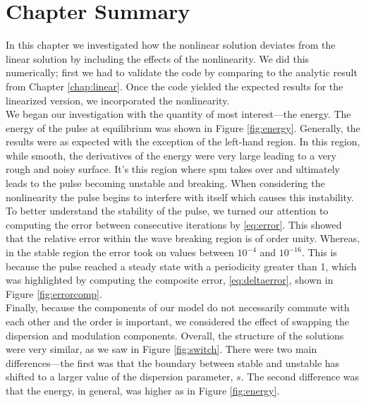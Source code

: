 \section{Chapter Summary}
In this chapter we investigated how the nonlinear solution deviates from the linear solution by including the effects of the nonlinearity. We did this numerically; first we had to validate the code by comparing to the analytic result from Chapter \ref{chap:linear}. Once the code yielded the expected results for the linearized version, we incorporated the nonlinearity. \\

We began our investigation with the quantity of most interest---the energy. The energy of the pulse at equilibrium was shown in Figure \ref{fig:energy}. Generally, the results were as expected with the exception of the left-hand region. In this region, while smooth, the derivatives of the energy were very large leading to a very rough and noisy surface. It's this region where \gls{spm} takes over and ultimately leads to the pulse becoming unstable and breaking. When considering the nonlinearity the pulse begins to interfere with itself which causes this instability. \\

To better understand the stability of the pulse, we turned our attention to computing the error between consecutive iterations by \eqref{eq:error}. This showed that the relative error within the wave breaking region is of order unity. Whereas, in the stable region the error took on values between $10^{-4}$ and $10^{-16}$. This is because the pulse reached a steady state with a periodicity greater than 1, which was highlighted by computing the composite error, \eqref{eq:deltaerror}, shown in Figure \ref{fig:errorcomp}. \\

Finally, because the components of our model do not necessarily commute with each other and the order is important, we considered the effect of swapping the dispersion and modulation components. Overall, the structure of the solutions were very similar, as we saw in Figure \ref{fig:switch}. There were two main differences---the first was that the boundary between stable and unstable has shifted to a larger value of the dispersion parameter, $s$. The second difference was that the energy, in general, was higher as in Figure \ref{fig:energy}. \\
